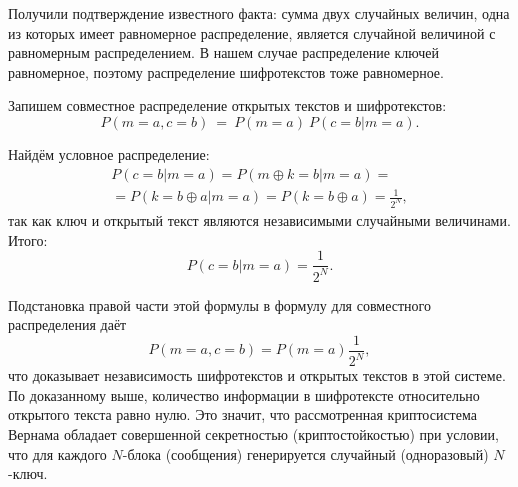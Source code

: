 Получили подтверждение известного факта: сумма двух случайных величин, одна из которых имеет равномерное распределение, является случайной величиной с равномерным распределением. В нашем случае распределение ключей равномерное, поэтому распределение шифротекстов тоже равномерное.

Запишем совместное распределение открытых текстов и шифротекстов:
    \[ P(m = a, c = b) ~=~ P(m = a) ~ P(c = b | m = a). \]

Найдём условное распределение:
\begin{multline*}
    P(c = b | m = a) = P(m \oplus k = b | m = a) = \\
    = P(k = b \oplus a | m = a) = P(k = b \oplus a) = \frac{1}{2^N},
\end{multline*}
так как ключ и открытый текст являются независимыми случайными величинами. Итого:
    \[ P(c=b | m=a) = \frac{1}{2^N}. \]

Подстановка правой части этой формулы в формулу для совместного распределения даёт
    \[ P(m=a,c=b)=P(m=a)\frac{1}{2^N}, \]
что доказывает независимость шифротекстов и открытых текстов в этой системе. По доказанному выше, количество информации в шифротексте относительно открытого текста равно нулю. Это значит, что рассмотренная криптосистема Вернама обладает совершенной секретностью (криптостойкостью) при условии, что для каждого $N$-блока (сообщения) генерируется случайный (одноразовый) $N$-ключ.



